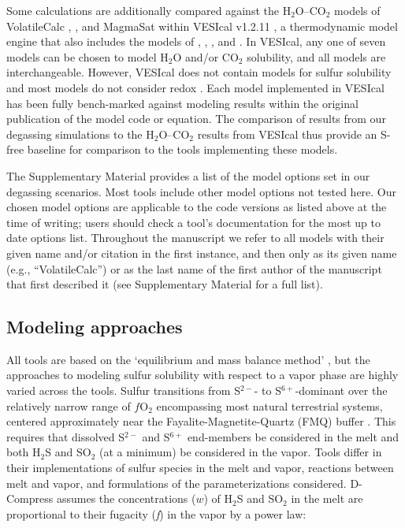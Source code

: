\documentclass[draft, english]{volcanica-template}
\begin{document}
Some calculations are additionally compared against the H$_2$O–CO$_2$ models of VolatileCalc \parencite[][``VolatileCalc'' or ``VC'']{Newman2002}, \textcite[][``IM'']{IaconoMarziano2012}, and MagmaSat \parencite[][``MagmaSat'']{GhiorsoGualda2015} within VESIcal v1.2.11 \parencite{Iacovino2021}, a thermodynamic model engine that also includes the models of \textcite{Moore1998}, \textcite{liu2005}, \textcite{Shishkina2014}, and \textcite{allison2019}. In VESIcal, any one of seven models can be chosen to model H$_2$O and/or CO$_2$ solubility, and all models are interchangeable. However, VESIcal does not contain models for sulfur solubility and most models do not consider redox \parencite[although MagmaSat accepts melt Fe$^{3+}$/Fe$_T$ as an input;][]{WieserVESIcal2022}. Each model implemented in VESIcal has been fully bench-marked against modeling results within the original publication of the model code or equation. The comparison of results from our degassing simulations to the H$_2$O–CO$_2$ results from VESIcal thus provide an S-free baseline for comparison to the tools implementing these models.

The Supplementary Material provides a list of the model options set in our degassing scenarios. Most tools include other model options not tested here. Our chosen model options are applicable to the code versions as listed above at the time of writing; users should check a tool's documentation for the most up to date options list. Throughout the manuscript we refer to all models with their given name and/or citation in the first instance, and then only as its given name (e.g., ``VolatileCalc'') or as the last name of the first author of the manuscript that first described it (see Supplementary Material for a full list). 

\subsection{Modeling approaches}
\label{sec:modelingapproaches}

All tools are based on the `equilibrium and mass balance method' \parencite{holloway1987igneous}, but the approaches to modeling sulfur solubility with respect to a vapor phase are highly varied across the tools. Sulfur transitions from S$^{2-}$- to S$^{6+}$-dominant over the relatively narrow range of $f$O$_2$ encompassing most natural terrestrial systems, centered approximately near the Fayalite-Magnetite-Quartz (FMQ) buffer \parencite{jugo2005,wallace1994s,carroll1988sulfur}. This requires that dissolved S$^{2-}$ and S$^{6+}$ end-members be considered in the melt and both H$_2$S and SO$_2$ (at a minimum) be considered in the vapor. Tools differ in their implementations of sulfur species in the melt and vapor, reactions between melt and vapor, and formulations of the parameterizations considered. D-Compress assumes the concentrations ($w$) of H$_2$S and SO$_2$ in the melt are proportional to their fugacity (\textit{f}) in the vapor by a power law: 
\end{document}
